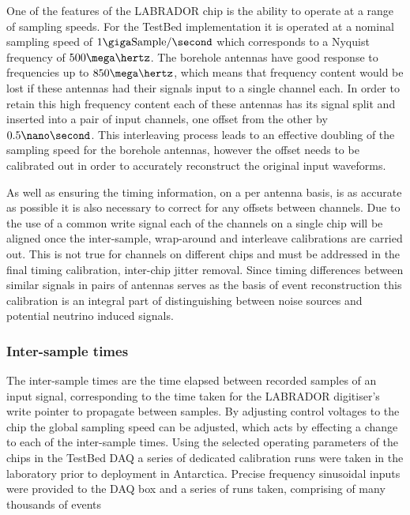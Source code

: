 One of the features of the LABRADOR chip is the ability to operate at a range of sampling speeds. For the TestBed implementation it is operated at a nominal sampling speed of $1 \giga \mbox{Sample} /\second$ which corresponds to a Nyquist frequency of $500 \mega \hertz$. The borehole antennas have good response to frequencies up to $850 \mega \hertz$, which means that frequency content would be lost if these antennas had their signals input to a single channel each. In order to retain this high frequency content each of these antennas has its signal split and inserted into a pair of input channels, one offset from the other by $0.5 \nano \second$. This interleaving process leads to an effective doubling of the sampling speed for the borehole antennas, however the offset needs to be calibrated out in order to accurately reconstruct the original input waveforms. 

As well as ensuring the timing information, on a per antenna basis, is as accurate as possible it is also necessary to correct for any offsets between channels. Due to the use of a common write signal each of the channels on a single chip will be aligned once the inter-sample, wrap-around and interleave calibrations are carried out. This is not true for channels on different chips and must be addressed in the final timing calibration, inter-chip jitter removal. Since timing differences between similar signals in pairs of antennas serves as the basis of event reconstruction this calibration is an integral part of distinguishing between noise sources and potential neutrino induced signals. 


\subsubsection{Inter-sample times}
\label{sec:calibration:LABRADOR-Digitiser-Chip:Inter-sample-times}

The inter-sample times are the time elapsed between recorded samples of an input signal, corresponding to the time taken for the LABRADOR digitiser's write pointer to propagate between samples. By adjusting control voltages to the chip the global sampling speed can be adjusted, which acts by effecting a change to each of the inter-sample times. Using the selected operating parameters of the chips in the TestBed DAQ a series of dedicated calibration runs were taken in the laboratory prior to deployment in Antarctica. Precise frequency sinusoidal inputs were provided to the DAQ box and a series of runs taken, comprising of many thousands of events

